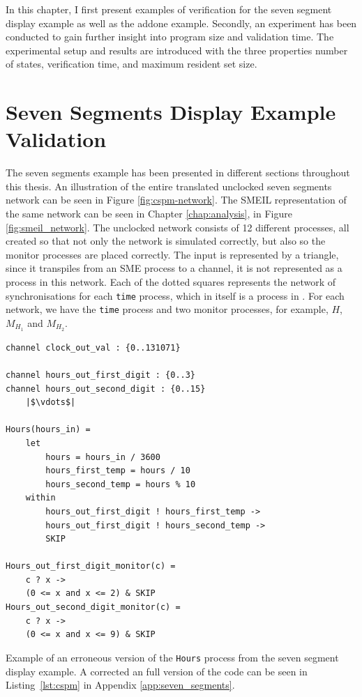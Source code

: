 
In this chapter, I first present examples of verification for the seven segment display example as well as the addone example. Secondly, an experiment has been conducted to gain further insight into program size and validation time. The experimental setup and results are introduced with the three properties number of states, verification time, and maximum resident set size.
\section{Seven Segments Display Example Validation}
The seven segments example has been presented in different sections throughout this thesis. An illustration of the entire translated unclocked seven segments network can be seen in Figure \ref{fig:cspm-network}. The SMEIL representation of the same network can be seen in Chapter \ref{chap:analysis}, in Figure \ref{fig:smeil_network}.
The unclocked \cspm{} network consists of 12 different processes, all created so that not only the network is simulated correctly, but also so the monitor processes are placed correctly. The input is represented by a triangle, since it transpiles from an SME process to a \cspm{} channel, it is not represented as a process in this network. Each of the dotted squares represents the network of synchronisations for each \texttt{time} process, which in itself is a process in \cspm{}. For each network, we have the \texttt{time} process and two monitor processes, for example, $H$, $M_{H_1}$ and $M_{H_2}$.
\\

\begin{listing}
\begin{verbatim}
channel clock_out_val : {0..131071}

channel hours_out_first_digit : {0..3}
channel hours_out_second_digit : {0..15}
    |$\vdots$|

Hours(hours_in) =
    let
        hours = hours_in / 3600
        hours_first_temp = hours / 10
        hours_second_temp = hours % 10
    within
        hours_out_first_digit ! hours_first_temp ->
        hours_out_first_digit ! hours_second_temp ->
        SKIP

Hours_out_first_digit_monitor(c) =
    c ? x ->
    (0 <= x and x <= 2) & SKIP
Hours_out_second_digit_monitor(c) =
    c ? x ->
    (0 <= x and x <= 9) & SKIP

\end{verbatim}
\caption{Example of an erroneous version of the \texttt{Hours} process from the \cspm{} seven segment display example. A corrected an full version of the code can be seen in Listing~\ref{lst:cspm} in Appendix \ref{app:seven_segments}.}
\label{lst:cspm_error}
\end{listing}

